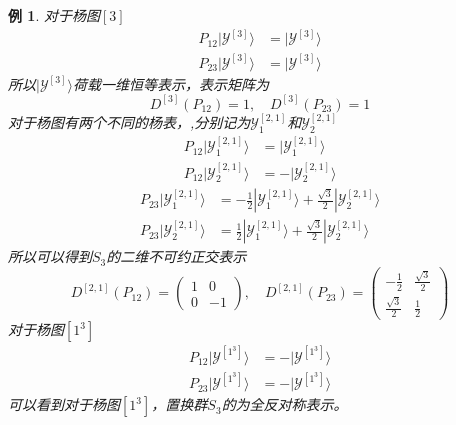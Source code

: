 \documentclass[12pt]{article}
\newtheorem{example}{例}[subsection]
\begin{document}
\begin{example}
    对于杨图$[3]$
    \begin{equation*}
        \begin{split}
            P_{12}|\mathcal{Y}^{[3]}\rangle&=|\mathcal{Y}^{[3]}\rangle\\
            P_{23}|\mathcal{Y}^{[3]}\rangle&=|\mathcal{Y}^{[3]}\rangle
        \end{split}
    \end{equation*}
    所以$|\mathcal{Y}^{[3]}\rangle$荷载一维恒等表示，表示矩阵为
    \begin{equation*}
        D^{[3]}(P_{12})=1,\quad D^{[3]}(P_{23})=1
    \end{equation*}
    对于杨图有两个不同的杨表，,分别记为$\mathcal{Y}_1^{[2,1]}$和$\mathcal{Y}_2^{[2,1]}$
    \begin{equation*}
        \begin{split}
            P_{12}|\mathcal{Y}_1^{[2,1]}\rangle&=|\mathcal{Y}_1^{[2,1]}\rangle\\
            P_{12}|\mathcal{Y}_2^{[2,1]}\rangle&=-|\mathcal{Y}_2^{[2,1]}\rangle
        \end{split}
    \end{equation*}
    \begin{equation*}
        \begin{split}
            P_{23}|\mathcal{Y}_1^{[2,1]}\rangle&=-\frac{1}{2}|\mathcal{Y}_1^{[2,1]}\rangle+\frac{\sqrt{3}}{2}|\mathcal{Y}_2^{[2,1]}\rangle\\
            P_{23}|\mathcal{Y}_2^{[2,1]}\rangle&=\frac{1}{2}|\mathcal{Y}_1^{[2,1]}\rangle+\frac{\sqrt{3}}{2}|\mathcal{Y}_2^{[2,1]}\rangle
        \end{split}
    \end{equation*}
    所以可以得到$S_3$的二维不可约正交表示
    \begin{equation*}
        D^{[2,1]}(P_{12})=\begin{pmatrix}
            1&0\\
            0&-1
        \end{pmatrix},\quad D^{[2,1]}(P_{23})=\begin{pmatrix}
            -\frac{1}{2}&\frac{\sqrt{3}}{2}\\
            \frac{\sqrt{3}}{2}&\frac{1}{2}
        \end{pmatrix}
    \end{equation*}
    对于杨图$[1^3]$
    \begin{equation*}
        \begin{split}
            P_{12}|\mathcal{Y}^{[1^3]}\rangle&=-|\mathcal{Y}^{[1^3]}\rangle\\
            P_{23}|\mathcal{Y}^{[1^3]}\rangle&=-|\mathcal{Y}^{[1^3]}\rangle
        \end{split}
    \end{equation*}
    可以看到对于杨图$[1^3]$，置换群$S_3$的为全反对称表示。
\end{example}
\end{document}
